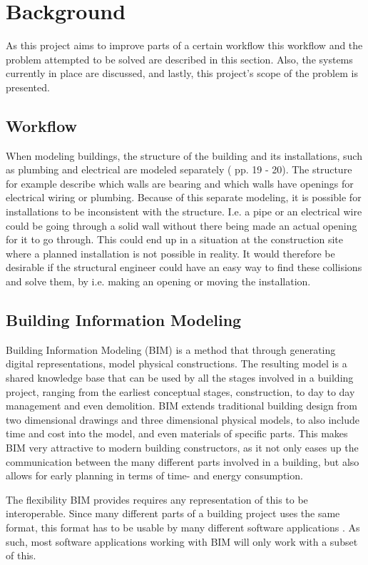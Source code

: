 \section{Background}
As this project aims to improve parts of a certain workflow this workflow and the problem attempted to be solved are described in this section. Also, the systems currently in place are discussed, and lastly, this project's scope of the problem is presented.
\subsection{Workflow}
\label{sec:workflow}
When modeling buildings, the structure of the building and its installations, such as plumbing and electrical are modeled separately (\cite{jorgensen10} pp. 19 - 20). The structure for example describe which walls are bearing and which walls have openings for electrical wiring or plumbing.  Because of this separate modeling, it is possible for installations to be inconsistent with the structure. I.e. a pipe or an electrical wire could be going through a solid wall without there being made an actual opening for it to go through. This could end up in a situation at the construction site where a planned installation is not possible in reality. It would therefore be desirable if the structural engineer could have an easy way to find these collisions and solve them, by i.e. making an opening or moving the installation\cite{jorgensen12}.
\subsection{Building Information Modeling}
\label{sec:building_information_modeling}
Building Information Modeling (BIM) is a method that through generating digital representations, model physical constructions. The resulting model is a shared knowledge base that can be used by all the stages involved in a building project, ranging from the earliest conceptual stages, construction, to day to day management and even demolition. BIM extends traditional building design from two dimensional drawings and three dimensional physical models, to also include time and cost into the model, and even materials of specific parts. This makes BIM very attractive to modern building constructors, as it not only eases up the communication between the many different parts involved in a building, but also allows for early planning in terms of time- and energy consumption.

The flexibility BIM provides requires any representation of this to be interoperable. Since many different parts of a building project uses the same format, this format has to be usable by many different software applications \cite{quteprints37725}. As such, most software applications working with BIM will only work with a subset of this.
